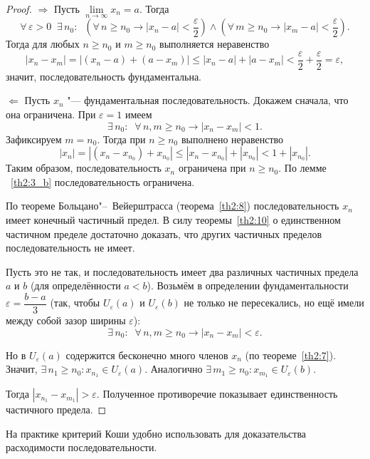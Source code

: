 \begin{proof}
\textbf{$\Longrightarrow$} Пусть $\lim\limits_{n \to \infty} x_n = a$. Тогда
$$
\forall\, \varepsilon > 0 \;\; \exists\, n_0 \colon \;\; \left(\forall\, n \ge n_0 \longrightarrow |x_n - a| < \frac{\varepsilon}{2}\right) \wedge \left(\forall\, m \ge n_0 \longrightarrow |x_m - a| < \frac{\varepsilon}{2}\right).
$$
Тогда для любых $n \ge n_0$ и $m \ge n_0$ выполняется неравенство
$$
|x_n - x_m| = |(x_n - a) + (a - x_m)| \le |x_n - a| + |a - x_m| < \frac{\varepsilon}{2} + \frac{\varepsilon}{2} = \varepsilon,
$$
значит, последовательность фундаментальна.

\medskip

\textbf{$\Longleftarrow$} Пусть $x_n$ "--- фундаментальная последовательность. Докажем сначала, что она ограничена. При $\varepsilon = 1$ имеем
$$
\exists\, n_0 \colon \;\; \forall\, n, m \ge n_0 \longrightarrow |x_n - x_m| < 1.
$$
Зафиксируем $m = n_0$. Тогда при $n \ge n_0$ выполнено неравенство
$$
|x_n| = |(x_n - x_{n_0}) + x_{n_0}| \le |x_n - x_{n_0}| + |x_{n_0}| < 1 + |x_{n_0}|.
$$
Таким образом, последовательность $x_n$ ограничена при $n \ge n_0$. По лемме ~\ref{th2:3_b} последовательность ограничена.

По теореме Больцано"--~Вейерштрасса (теорема~\ref{th2:8}) последовательность $x_n$ имеет конечный частичный предел. В силу теоремы~\ref{th2:10} о единственном частичном пределе достаточно доказать, что других частичных пределов последовательность не имеет.

Пусть это не так, и последовательность имеет два различных частичных предела $a$ и $b$ (для определённости $a < b$). Возьмём в определении фундаментальности $\varepsilon = \dfrac{b - a}{3}$ (так, чтобы $U_\varepsilon(a)$ и $U_\varepsilon(b)$ не только не пересекались, но ещё имели между собой зазор ширины $\varepsilon$):
$$
\exists\, n_0 \colon \;\; \forall\, n, m \ge n_0 \longrightarrow |x_n - x_m| < \varepsilon.
$$

Но в $U_\varepsilon(a)$ содержится бесконечно много членов $x_n$ (по теореме~\ref{th2:7}). Значит, $\exists\, n_1 \ge n_0 \colon x_{n_1} \in U_\varepsilon(a)$. Аналогично $\exists\, m_1 \ge n_0 \colon x_{m_1} \in U_\varepsilon(b)$.

Тогда $|x_{n_1} - x_{m_1}| > \varepsilon$. Полученное противоречие показывает единственность частичного предела.
\end{proof}

\begin{notion}
На практике критерий Коши удобно использовать для доказательства расходимости последовательности.
\end{notion}

